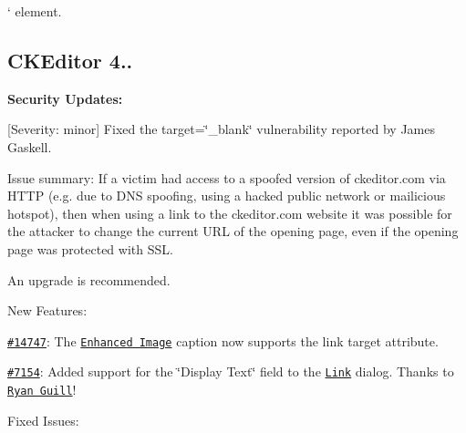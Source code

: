 ` element.

\subsection*{C\+K\+Editor 4..}

{\bfseries Security Updates\+:}


\begin{DoxyItemize}
\item \mbox{[}Severity\+: minor\mbox{]} Fixed the target=\char`\"{}\+\_\+blank\char`\"{} vulnerability reported by James Gaskell.

Issue summary\+: If a victim had access to a spoofed version of ckeditor.\+com via H\+T\+TP (e.\+g. due to D\+NS spoofing, using a hacked public network or mailicious hotspot), then when using a link to the ckeditor.\+com website it was possible for the attacker to change the current U\+RL of the opening page, even if the opening page was protected with S\+SL.

An upgrade is recommended.
\end{DoxyItemize}

New Features\+:


\begin{DoxyItemize}
\item \href{http://dev.ckeditor.com/ticket/14747}{\tt \#14747}\+: The \href{http://ckeditor.com/addon/image2}{\tt Enhanced Image} caption now supports the link {\ttfamily target} attribute.
\item \href{http://dev.ckeditor.com/ticket/7154}{\tt \#7154}\+: Added support for the \char`\"{}\+Display Text\char`\"{} field to the \href{http://ckeditor.com/addon/link}{\tt Link} dialog. Thanks to \href{https://github.com/ryanguill}{\tt Ryan Guill}!
\end{DoxyItemize}

Fixed Issues\+:


